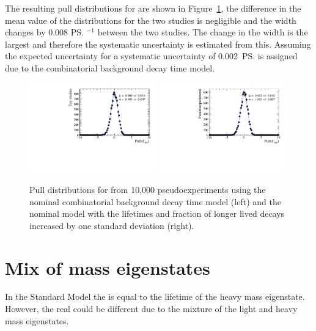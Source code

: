 The resulting pull distributions for \Gmumu are shown in Figure~\ref{fig:CBGextreme}, the difference in the mean value of the distributions for the two studies is negligible and the width changes by 0.008 \ps$^{-1}$ between the two studies. The change in the width is the largest and therefore the systematic uncertainty is estimated from this. Assuming the expected uncertainty for \tmumu a systematic uncertainty of 0.002~\ps is assigned due to the combinatorial background decay time model.

\begin{figure}[tbp]
  \centering
    \includegraphics[width=0.49\textwidth]{./Figs/LifetimeSystematics/Gamma_pull_mass_pdf_Run1.pdf}
    \includegraphics[width=0.49\textwidth]{./Figs/LifetimeSystematics/Bs2MuMu_gamma_pull_CKM_extremeCBG_DT.pdf}
  \caption{Pull distributions for \Gmumu from 10,000 pseudoexperiments using the nominal combinatorial background decay time model (left) and the nominal model with the lifetimes and fraction of longer lived decays increased by one standard deviation (right).}
  \label{fig:CBGextreme}
\end{figure}


\section[Mix of \bs mass eigenstates]{Mix of \boldmath{\bs} mass eigenstates}
\label{sec:mixofeigenstates}

In the Standard Model the \bsmumu \el is equal to the lifetime of the heavy \bs mass eigenstate. However, the real \bsmumu \el could be different due to the mixture of the light and heavy mass eigenstates. %

